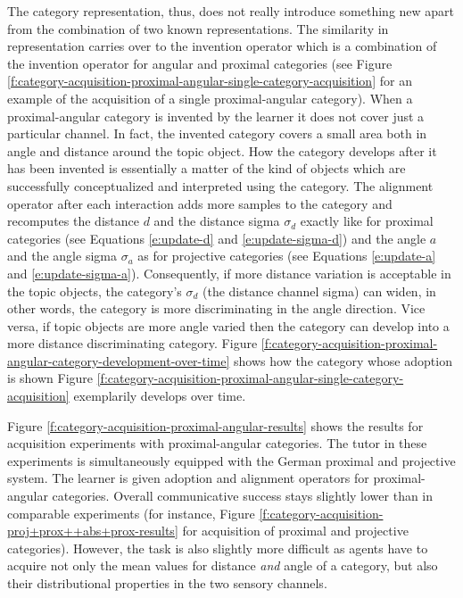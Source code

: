 The category representation, thus, does not really introduce something 
new apart from the combination of two known representations. The similarity in 
representation carries over to the invention operator which is a combination of 
the invention operator for angular and proximal categories 
(see Figure \ref{f:category-acquisition-proximal-angular-single-category-acquisition} 
for an example of the acquisition of a single proximal-angular category).
When a proximal-angular category is invented by the learner it does not cover just a
particular channel. In fact, the invented category covers a small area both 
in angle and distance around the topic object. How the category develops after it has been invented is essentially a matter of the kind of objects which are successfully conceptualized and
interpreted using the category. The alignment operator after each interaction adds more samples 
to the category and recomputes the distance $d$ 
and the distance sigma $\sigma_d$ exactly like for proximal categories
(see Equations \ref{e:update-d} and \ref{e:update-sigma-d}) and 
the angle $a$ and the angle sigma $\sigma_a$ as for projective categories 
(see Equations \ref{e:update-a} and \ref{e:update-sigma-a}). 
Consequently, if more distance variation is acceptable
in the topic objects, the category's $\sigma_d$ (the distance channel sigma) 
can widen, in other words, the category is more discriminating in the angle direction. 
Vice versa, if topic objects are more angle varied then the category can 
develop into a more distance discriminating category. Figure 
\ref{f:category-acquisition-proximal-angular-category-development-over-time} shows how 
the category whose adoption is shown Figure \ref{f:category-acquisition-proximal-angular-single-category-acquisition} exemplarily develops over time. 

Figure \ref{f:category-acquisition-proximal-angular-results} 
shows the results for acquisition experiments with proximal-angu\-lar 
categories. The tutor in these experiments is simultaneously 
equipped with the German proximal and projective system. 
The learner is given adoption and alignment operators for proximal-angular 
categories. Overall communicative success stays slightly lower than in comparable experiments
(for instance, Figure \ref{f:category-acquisition-proj+prox++abs+prox-results} for acquisition of
proximal and projective categories). However, the task is also slightly
more difficult as agents have to acquire not only the mean values for distance \textit{and} angle of a
category, but also their distributional properties in the two sensory channels.

